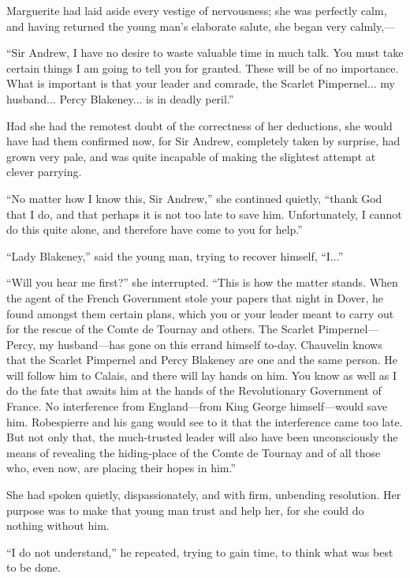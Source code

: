 \documentclass[paper=a5,BCOR=7mm,twoside,DIV=calc,12pt,usegeometry,chapterprefix,endperiod,headings=big]{scrbook}
\begin{document}
Marguerite had laid aside every vestige of nervousness; she was perfectly calm, and having returned the young man's elaborate salute, she began very calmly,---

\enquote{Sir Andrew, I have no desire to waste valuable time in much talk. You must take certain things I am going to tell you for granted. These will be of no importance. What is important is that your leader and comrade, the Scarlet Pimpernel... my husband... Percy Blakeney... is in deadly peril.}

Had she had the remotest doubt of the correctness of her deductions, she would have had them confirmed now, for Sir Andrew, completely taken by surprise, had grown very pale, and was quite incapable of making the slightest attempt at clever parrying.

\enquote{No matter how I know this, Sir Andrew,} she continued quietly, \enquote{thank God that I do, and that perhaps it is not too late to save him. Unfortunately, I cannot do this quite alone, and therefore have come to you for help.}

\enquote{Lady Blakeney,} said the young man, trying to recover himself, \enquote{I...}

\enquote{Will you hear me first?} she interrupted. \enquote{This is how the matter stands. When the agent of the French Government stole your papers that night in Dover, he found amongst them certain plans, which you or your leader meant to carry out for the rescue of the Comte de Tournay and others. The Scarlet Pimpernel---Percy, my husband---has gone on this errand himself to-day. Chauvelin knows that the Scarlet Pimpernel and Percy Blakeney are one and the same person. He will follow him to Calais, and there will lay hands on him. You know as well as I do the fate that awaits him at the hands of the Revolutionary Government of France. No interference from England---from King George himself---would save him. Robespierre and his gang would see to it that the interference came too late. But not only that, the much-trusted leader will also have been unconsciously the means of revealing the hiding-place of the Comte de Tournay and of all those who, even now, are placing their hopes in him.}

She had spoken quietly, dispassionately, and with firm, unbending resolution. Her purpose was to make that young man trust and help her, for she could do nothing without him.

\enquote{I do not understand,} he repeated, trying to gain time, to think what was best to be done.
\end{document}
